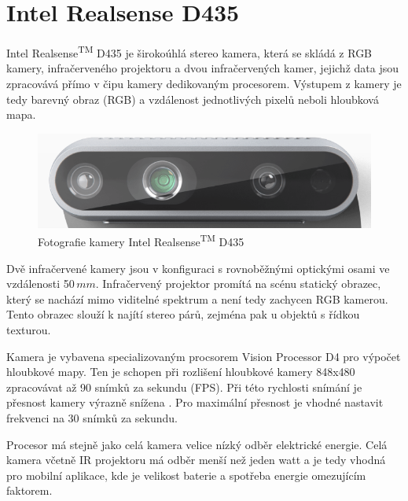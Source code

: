 \documentclass[twoside]{ctuthesis}
\begin{document}
\section{Intel Realsense D435}
Intel\textregistered{} Realsense\textsuperscript{TM} D435 je širokoúhlá stereo kamera, která se skládá z RGB kamery, infračerveného projektoru a dvou infračervených kamer, jejichž data jsou zpracovává přímo v čipu kamery dedikovaným procesorem. Výstupem z kamery je tedy barevný obraz (RGB) a vzdálenost jednotlivých pixelů neboli hloubková mapa. 

\begin{figure}
    \centering
    \includegraphics[width = 0.8\linewidth]{pictures/realsense_kamera.png}
    \caption{Fotografie kamery Intel\textregistered{} Realsense\textsuperscript{TM} D435 \cite{Realsense_obrazek}}
    \label{Fig:realsense_pic}
\end{figure}

    Dvě infračervené kamery jsou v konfiguraci s rovnoběžnými optickými osami ve vzdálenosti 50$\,mm$. Infračervený projektor promítá na scénu statický obrazec, který se nachází mimo viditelné spektrum a není tedy zachycen RGB kamerou. Tento obrazec slouží k najítí stereo párů, zejména pak u objektů s řídkou texturou.

    Kamera je vybavena specializovaným procsorem Vision Processor D4 pro výpočet hloubkové mapy. Ten je schopen při rozlišení hloubkové kamery 848x480 zpracovávat až 90 snímků za sekundu (FPS). Při této rychlosti snímání je přesnost kamery výrazně snížena \cite{keselman2017intel}. Pro maximální přesnost je vhodné nastavit frekvenci na 30 snímků za sekundu. 
    
    Procesor má stejně jako celá kamera velice nízký odběr elektrické energie. Celá kamera včetně IR projektoru má odběr menší než jeden watt a je tedy vhodná pro mobilní aplikace, kde je velikost baterie a spotřeba energie omezujícím faktorem. \cite{RealSense_datasheet} 
\end{document}
